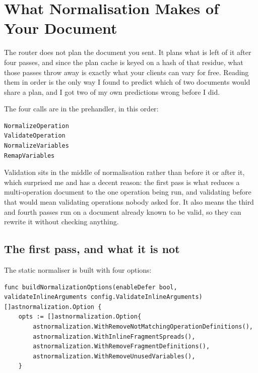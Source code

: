 \section{What Normalisation Makes of Your Document}
\label{sec:ch17-what-normalization-makes}
%

The router does not plan the document you sent. It plans what is left of it
after four passes, and since the plan cache is keyed on a hash of that residue,
what those passes throw away is exactly what your clients can vary for free.
Reading them in order is the only way I found to predict which of two documents
would share a plan, and I got two of my own predictions wrong before I did.

%
The four calls are in the prehandler, in this order:

\begin{verbatim}
NormalizeOperation
ValidateOperation
NormalizeVariables
RemapVariables
\end{verbatim}

Validation sits in the middle of normalisation rather than before it or after
it, which surprised me and has a decent reason: the first pass is what reduces a
multi-operation document to the one operation being run, and validating before
that would mean validating operations nobody asked for. It also means the third
and fourth passes run on a document already known to be valid, so they can
rewrite it without checking anything.

\subsection*{The first pass, and what it is not}

%
The static normaliser is built with four options:

\begin{verbatim}
func buildNormalizationOptions(enableDefer bool, validateInlineArguments config.ValidateInlineArguments) []astnormalization.Option {
	opts := []astnormalization.Option{
		astnormalization.WithRemoveNotMatchingOperationDefinitions(),
		astnormalization.WithInlineFragmentSpreads(),
		astnormalization.WithRemoveFragmentDefinitions(),
		astnormalization.WithRemoveUnusedVariables(),
	}
\end{verbatim}


